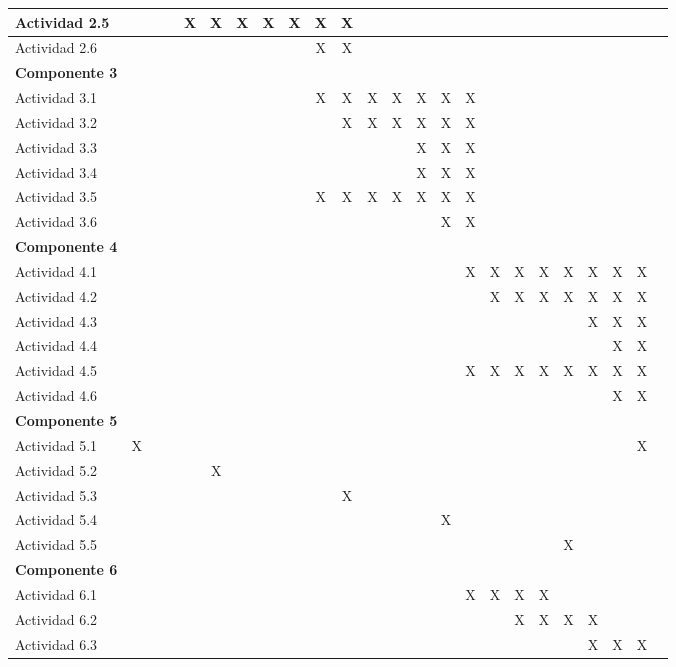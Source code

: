 \documentclass[]{article}
\begin{document}
\begin{table}[!htb]
{\begin{tabular}{|l|c|c|c|c|c|c|c|c|c|c|c|c|c|c|c|c|c|c|c|c|c|c|c|}
    Actividad 2.5 & & & & X & X & X & X & X & X & X & & & & & & & & & & & & \\ \hline
    Actividad 2.6 & & & & & & & & & X & X & & & & & & & & & & & & \\ \hline
    \textbf{Componente 3} & \multicolumn{22}{|l|}{}\\ \hline
    Actividad 3.1 & & & & & & & & & X & X & X & X & X & X & X & & & & & & & \\ \hline
    Actividad 3.2 & & & & & & & & & & X & X & X & X & X & X & & & & & & & \\ \hline
    Actividad 3.3 & & & & & & & & & & & & & X & X & X & & & & & & & \\ \hline
    Actividad 3.4 & & & & & & & & & & & & & X & X & X & & & & & & & \\ \hline
    Actividad 3.5 & & & & & & & & & X & X & X & X & X & X & X & & & & & & & \\ \hline
    Actividad 3.6 & & & & & & & & & & & & & & X & X & & & & & & & \\ \hline
    \textbf{Componente 4} & \multicolumn{22}{|l|}{}\\ \hline
    Actividad 4.1 & & & & & & & & & & & & & & & X & X & X & X & X & X & X & X\\ \hline
    Actividad 4.2 & & & & & & & & & & & & & & & & X & X & X & X & X & X & X\\ \hline
    Actividad 4.3 & & & & & & & & & & & & & & & & & & & & X & X & X \\ \hline
    Actividad 4.4 & & & & & & & & & & & & & & & & & & & & & X & X\\ \hline
    Actividad 4.5 & & & & & & & & & & & & & & & X & X & X & X & X & X & X & X\\ \hline
    Actividad 4.6 & & & & & & & & & & & & & & & & & & & & & X & X\\ \hline
    \textbf{Componente 5} & \multicolumn{22}{|l|}{}\\ \hline
    Actividad 5.1 & X & & & & & & & & & & & & & & & & & & & & & X\\ \hline
    Actividad 5.2 & & & & & X & & & & & & & & & & & & & & & & & \\ \hline
    Actividad 5.3 & & & & & & & & & & X & & & & & & & & & & & & \\ \hline
    Actividad 5.4 & & & & & & & & & & & & & & X & & & & & & & & \\ \hline
    Actividad 5.5 & & & & & & & & & & & & & & & & & & & X & & & \\ \hline
    \textbf{Componente 6} & \multicolumn{22}{|l|}{}\\ \hline
    Actividad 6.1 & & & & & & & & & & & & & & & X & X & X & X & & & & \\ \hline
    Actividad 6.2 & & & & & & & & & & & & & & & & & X & X & X & X & & \\ \hline
    Actividad 6.3 & & & & & & & & & & & & & & & & & & & & X & X & X\\ \hline
\end{tabular}
}
\end{table}
\end{document}

